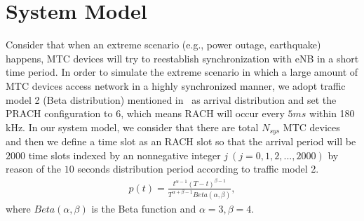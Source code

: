 \section{System Model}
\label{system model}



    Consider that when an extreme scenario (e.g., power outage, earthquake) happens, MTC devices will try to reestablish synchronization with eNB in a short time period. In order to simulate the extreme scenario in which a large amount of MTC devices access network in a highly synchronized manner, we adopt traffic model 2 (Beta distribution) mentioned in~\cite{3GPP37.868} as arrival distribution and set the PRACH configuration to $6$, which means RACH will occur every $5 ms$ within 180 kHz. In our system model, we consider that there are total $N_{sys}$ MTC devices and then we define a time slot as an RACH slot so that the arrival period will be $2000$ time slots indexed by an nonnegative integer $j \ (j = 0, 1, 2, . . . , 2000)$ by reason of the $10$ seconds distribution period according to traffic model 2.
    \begin{eqnarray}
        p(t)=\frac{t^{\alpha-1 }(T-t)^{\beta -1}} {T^{\alpha + \beta -1} Beta(\alpha,\beta)},
    \end{eqnarray}
     where $Beta(\alpha,\beta)$ is the Beta function and $\alpha=3, \beta=4$.


